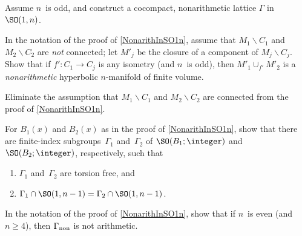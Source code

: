 \begin{exercises}
\item \label{CocpctNonarithInSO1n}
 Assume $n$~is odd, and construct a cocompact,
nonarithmetic lattice $\Gamma$ in $\SO(1,n)$.

\item \label{hybrid(notconn)}
 In the notation of the proof of \cref{NonarithInSO1n},
assume that $M_1 \smallsetminus C_1$ and $M_2
\smallsetminus C_2$ are \emph{not} connected; let $M'_j$ be
the closure of a component of $M_j \smallsetminus C_j$.
Show that if $f' \colon C_1 \to C_j$ is any isometry (and
$n$~is odd), then $M'_1 \cup_{f'} M'_2$ is a
\emph{nonarithmetic} hyperbolic $n$-manifold of finite
volume.

\item \label{NonarithInSO1nPf(notconn)}
 Eliminate the assumption that $M_1 \smallsetminus C_1$ and
$M_2 \smallsetminus C_2$ are connected from the proof of
\cref{NonarithInSO1n}.

\item \label{hybrid:Gamma1=Gamma2Ex}
 For $B_1(x)$ and $B_2(x)$ as in the proof of
\cref{NonarithInSO1n}, show that there are finite-index
subgroups~$\Gamma_1$ and~$\Gamma_2$ of $\SO(B_1;\integer)$
and $\SO(B_2;\integer)$, respectively, such that
 \begin{enumerate}
 \item $\Gamma_1$ and~$\Gamma_2$ are torsion free, and
 \item $\Gamma_1 \cap \SO(1,n-1) = \Gamma_2 \cap
\SO(1,n-1)$.
 \end{enumerate}

\item \label{hybrid:nEvenNotArith}
 In the notation of the proof of \cref{NonarithInSO1n},
show that if $n$~is even (and $n \ge 4$), then
$\Gamma_\text{\upshape non}$ is not arithmetic.


\end{exercises}
